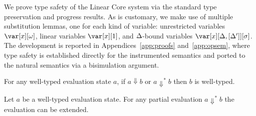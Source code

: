 \documentclass[acmsmall,review,anonymous,screen]{acmart}
\begin{document}

We prove type safety of the Linear Core system via the standard type
preservation and progress results. As is customary, we make use of multiple
substitution lemmas, one for each kind of variable: unrestricted variables
$\xo$, linear variables $\xl$, and $\Delta$-bound variables $\xD$. The
development is reported in Appendices~\ref{app:proofs}
and~\ref{app:opsem}, where type safety is established directly for the
instrumented semantics and ported to the natural semantics via a
bisimulation argument.

  \begin{theorem}
    For any well-typed evaluation state $a$, if $a \Downarrow
    b$ or $a \Downarrow^* b$ then $b$ is well-typed.
\end{theorem}
\begin{theorem}[Progress]
Let $a$ be a well-typed evaluation state. For any partial evaluation $a \Downarrow^* b$ 
the evaluation can be extended.
\end{theorem}

\end{document}
